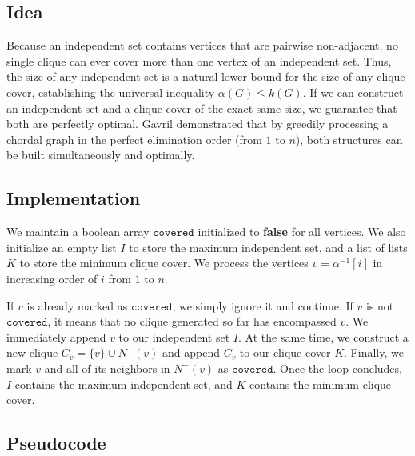 \subsection{Idea}
Because an independent set contains vertices that are pairwise non-adjacent, no single clique can ever cover more than one vertex of an independent set. Thus, the size of any independent set is a natural lower bound for the size of any clique cover, establishing the universal inequality $\alpha(G) \le k(G)$. If we can construct an independent set and a clique cover of the exact same size, we guarantee that both are perfectly optimal. Gavril \cite{Gavril1972} demonstrated that by greedily processing a chordal graph in the perfect elimination order (from $1$ to $n$), both structures can be built simultaneously and optimally.

\subsection{Implementation}
We maintain a boolean array $\texttt{covered}$ initialized to \textbf{false} for all vertices. We also initialize an empty list $I$ to store the maximum independent set, and a list of lists $K$ to store the minimum clique cover. We process the vertices $v = \alpha^{-1}[i]$ in increasing order of $i$ from $1$ to $n$. 

If $v$ is already marked as $\texttt{covered}$, we simply ignore it and continue. If $v$ is not $\texttt{covered}$, it means that no clique generated so far has encompassed $v$. We immediately append $v$ to our independent set $I$. At the same time, we construct a new clique $C_v = \{v\} \cup N^+(v)$ and append $C_v$ to our clique cover $K$. Finally, we mark $v$ and all of its neighbors in $N^+(v)$ as $\texttt{covered}$. Once the loop concludes, $I$ contains the maximum independent set, and $K$ contains the minimum clique cover.

\subsection{Pseudocode}

